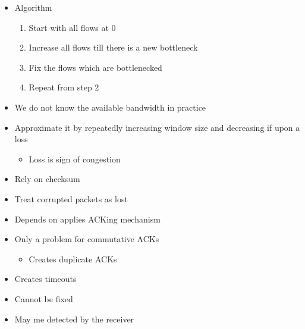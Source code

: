 \begin{itemize}
\begin{itemize}
                \begin{itemize}
                    \item Algorithm
                        \begin{enumerate}
                            \item Start with all flows at $0$
                            \item Increase all flows till there is a new bottleneck
                            \item Fix the flows which are bottlenecked
                            \item Repeat from step 2
                        \end{enumerate}
                    \item We do not know the available bandwidth in practice
                    \item Approximate it by repeatedly increasing window size and decreasing if upon a loss
                        \begin{itemize}
                            \item Loss is sign of congestion
                        \end{itemize}
                \end{itemize}
        \end{itemize}
        \begin{itemize}
                \begin{itemize}
                    \item Rely on checksum
                    \item Treat corrupted packets as lost
                \end{itemize}
                \begin{itemize}
                    \item Depends on applies ACKing mechanism
                    \item Only a problem for commutative ACKs
                        \begin{itemize}
                            \item Creates duplicate ACKs
                        \end{itemize}
                \end{itemize}
                \begin{itemize}
                    \item Creates timeouts
                    \item Cannot be fixed
                \end{itemize}
                \begin{itemize}
                    \item May me detected by the receiver


\end{itemize}
\end{itemize}
\end{itemize}
